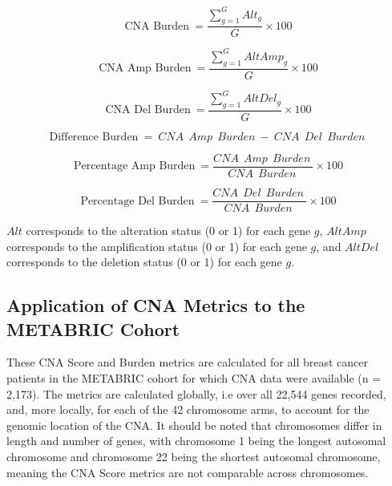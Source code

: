 \begin{equation}
\text{CNA Burden}\: = \frac{\sum_{g = 1}^{G}  Alt_g}{G}\times100
\label{eq:CNAB1}
\end{equation}

\begin{equation}
\text{CNA Amp Burden}\: = \frac{\sum_{g = 1}^{G} {AltAmp}_g}{G}\times100
\label{eq:CNAB2}
\end{equation}

\begin{equation}
\text{CNA Del Burden}\: = \frac{\sum_{g = 1}^{G} {AltDel}_g}{G}\times100
\label{eq:CNAB3}
\end{equation}

\begin{equation}
\text{Difference Burden}\: = \:CNA\:\:Amp\:\:Burden\: - \:CNA\:\:Del\:\:Burden\:
\label{eq:CNAB4}
\end{equation}

\begin{equation}
\text{Percentage Amp Burden}\: = \frac{CNA\:\:Amp\:\:Burden\:}{CNA\:\:Burden\:}\times100
\label{eq:CNAB5}
\end{equation}

\begin{equation}
\text{Percentage Del Burden}\: = \frac{CNA\:\:Del\:\:Burden\:}{CNA\:\:Burden\:}\times100
\label{eq:CNAB6}
\end{equation}

$Alt$ corresponds to the alteration status (0 or 1) for each gene $g$, $AltAmp$ corresponds to the amplification status (0 or 1) for each gene $g$, and $AltDel$ corresponds to the deletion status (0 or 1) for each gene $g$.

\subsection{Application of CNA Metrics to the METABRIC Cohort}
These CNA Score and Burden metrics are calculated for all breast cancer patients in the METABRIC cohort for which CNA data were available (n = 2,173). The metrics are calculated globally, i.e over all 22,544 genes recorded, and, more locally, for each of the 42 chromosome arms, to account for the genomic location of the CNA. It should be noted that chromosomes differ in length and number of genes, with chromosome 1 being the longest autosomal chromosome and chromosome 22 being the shortest autosomal chromosome, meaning the CNA Score metrics are not comparable across chromosomes. 

